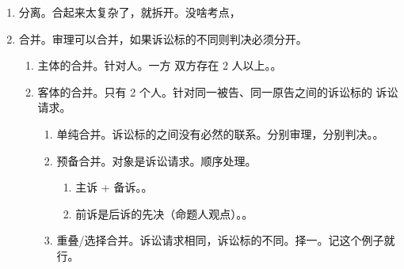 \begin{enumerate}
\begin{kk}{反诉是一个独立的诉}
\begin{enumerate}
                  \begin{enumerate}
                    \item 都可以用来反对对方请求。
                    \item 反驳、反诉互斥。但可以认为是抗辩，也可以认为是反诉（）。
                          。
                  \end{enumerate}
            \item 绝对不允许去看法律效果，不能去看“抵销”、“折抵”。
          \end{enumerate}
        \end{kk}
  \item 分离。合起来太复杂了，就拆开。没啥考点，
  \item 合并。审理可以合并，如果诉讼标的不同则判决必须分开。
        \begin{enumerate}
          \item 主体的合并。针对人。一方 \hz 双方存在 2 人以上。。
          \item 客体的合并。只有 2 个人。针对同一被告、同一原告之间的诉讼标的 \hz 诉讼请求。
                \begin{enumerate}
                  \item 单纯合并。诉讼标的之间没有必然的联系。分别审理，分别判决。。
                  \item 预备合并。对象是诉讼请求。顺序处理。
                        \begin{enumerate}
                          \item 主诉 + 备诉。。
                          \item 前诉是后诉的先决（命题人观点）。。
                        \end{enumerate}
                  \item 重叠/选择合并。诉讼请求相同，诉讼标的不同。择一。记这个例子就行。
                \end{enumerate}
        \end{enumerate}
\end{enumerate}
